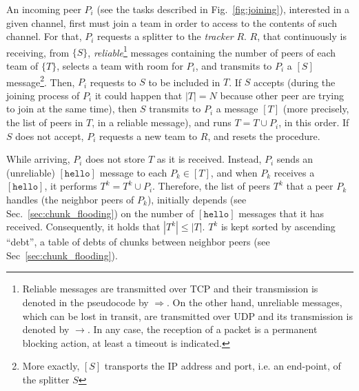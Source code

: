 
\label{sec:peer_joining}
\begin{figure*}
   \caption{Tasks involved in a peer
    joining. $P_i$ is the incoming peer, and $P_k$ is a peer that is
    already in the team. $R$ represents the tracker, and $S$ the
    splitter of the team $T$ to which $P_k$ belongs, and $P_i$ will be
    added.\label{fig:joining}}
\end{figure*}
An incoming peer $P_i$ (see the tasks described in
Fig.~\ref{fig:joining}), interested in a given channel, first must
join a team in order to access to the contents of such channel. For
that, $P_i$ requests a splitter to the \emph{tracker} $R$. $R$, that
continuously is receiving, from $\{S\}$,
\emph{reliable}\footnote{Reliable messages are transmitted over TCP
  and their transmission is denoted in the pseudocode by
  $\Rightarrow$. On the other hand, unreliable messages, which can be
  lost in transit, are transmitted over UDP and its transmission is
  denoted by $\rightarrow$. In any case, the reception of a packet is
  a permanent blocking action, at least a timeout is indicated.}
messages containing the number of peers of each team of $\{T\}$,
selects a team with room for $P_i$, and transmits to $P_i$ a $[S]$
message\footnote{More exactly, $[S]$ transports the IP address and
  port, i.e. an end-point, of the splitter $S$}. Then, $P_i$ requests
to $S$ to be included in $T$. If $S$ accepts (during the joining
process of $P_i$ it could happen that $|T|=N$ because other peer are
trying to join at the same time), then $S$ transmits to $P_i$ a
message $[T]$ (more precisely, the list of peers in $T$, in a reliable
message), and runs $T = T \cup P_i$, in this order. If $S$ does not
accept, $P_i$ requests a new team to $R$, and resets the procedure.


While arriving, $P_i$ does not store $T$ as it is received. Instead,
$P_i$ sends an (unreliable) $[\mathtt{hello}]$ message to each $P_k\in
[T]$, and when $P_k$ receives a $[\mathtt{hello}]$, it performs $T^k =
T^k \cup P_i$. Therefore, the list of peers $T^k$ that a peer $P_k$
handles (the neighbor peers of $P_k$), initially depends (see
Sec.~\ref{sec:chunk_flooding}) on the number of $[\mathtt{hello}]$
messages that it has received. Consequently, it holds that $|T^k| \le
|T|$. $T^k$ is kept sorted by ascending ``debt'', a table of debts of
chunks between neighbor peers (see Sec~\ref{sec:chunk_flooding}).

